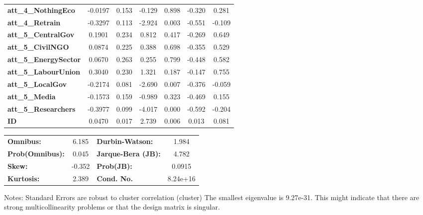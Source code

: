 \begin{center}
\begin{tabular}{lcccccc}
\textbf{att\_4\_NothingEco}                         &      -0.0197  &        0.153     &    -0.129  &         0.898        &       -0.320    &        0.281     \\
\textbf{att\_4\_Retrain}                            &      -0.3297  &        0.113     &    -2.924  &         0.003        &       -0.551    &       -0.109     \\
\textbf{att\_5\_CentralGov}                         &       0.1901  &        0.234     &     0.812  &         0.417        &       -0.269    &        0.649     \\
\textbf{att\_5\_CivilNGO}                           &       0.0874  &        0.225     &     0.388  &         0.698        &       -0.355    &        0.529     \\
\textbf{att\_5\_EnergySector}                       &       0.0670  &        0.263     &     0.255  &         0.799        &       -0.448    &        0.582     \\
\textbf{att\_5\_LabourUnion}                        &       0.3040  &        0.230     &     1.321  &         0.187        &       -0.147    &        0.755     \\
\textbf{att\_5\_LocalGov}                           &      -0.2174  &        0.081     &    -2.690  &         0.007        &       -0.376    &       -0.059     \\
\textbf{att\_5\_Media}                              &      -0.1573  &        0.159     &    -0.989  &         0.323        &       -0.469    &        0.155     \\
\textbf{att\_5\_Researchers}                        &      -0.3977  &        0.099     &    -4.017  &         0.000        &       -0.592    &       -0.204     \\
\textbf{ID}                                         &       0.0470  &        0.017     &     2.739  &         0.006        &        0.013    &        0.081     \\
\bottomrule
\end{tabular}
\begin{tabular}{lclc}
\textbf{Omnibus:}       &  6.185 & \textbf{  Durbin-Watson:     } &    1.984  \\
\textbf{Prob(Omnibus):} &  0.045 & \textbf{  Jarque-Bera (JB):  } &    4.782  \\
\textbf{Skew:}          & -0.352 & \textbf{  Prob(JB):          } &   0.0915  \\
\textbf{Kurtosis:}      &  2.389 & \textbf{  Cond. No.          } & 8.24e+16  \\
\bottomrule
\end{tabular}
\end{center}

Notes: \newline
 [1] Standard Errors are robust to cluster correlation (cluster) \newline
 [2] The smallest eigenvalue is 9.27e-31. This might indicate that there are \newline
 strong multicollinearity problems or that the design matrix is singular.